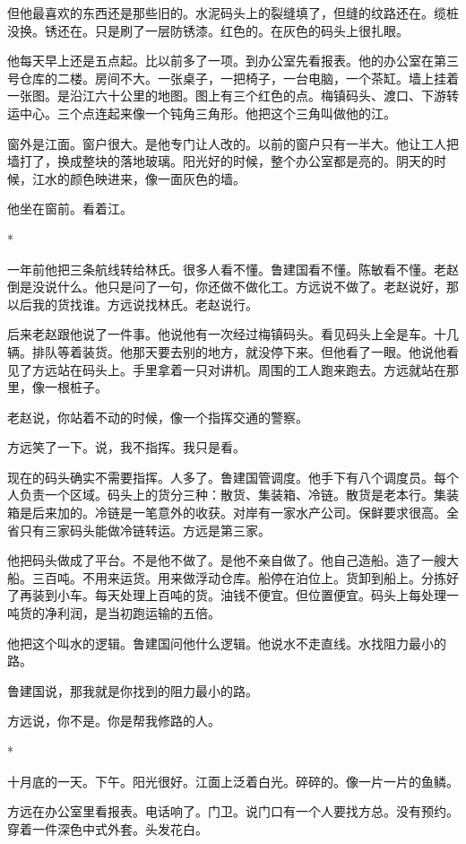 \documentclass[UTF8,a5paper,11pt,openany]{ctexbook}
\newcommand{\scene}{\vspace{1em}\begin{center}*\quad*\quad*\end{center}\vspace{0.5em}}
\begin{document}
但他最喜欢的东西还是那些旧的。水泥码头上的裂缝填了，但缝的纹路还在。缆桩没换。锈还在。只是刷了一层防锈漆。红色的。在灰色的码头上很扎眼。

他每天早上还是五点起。比以前多了一项。到办公室先看报表。他的办公室在第三号仓库的二楼。房间不大。一张桌子，一把椅子，一台电脑，一个茶缸。墙上挂着一张图。是沿江六十公里的地图。图上有三个红色的点。梅镇码头、渡口、下游转运中心。三个点连起来像一个钝角三角形。他把这个三角叫做他的江。

窗外是江面。窗户很大。是他专门让人改的。以前的窗户只有一半大。他让工人把墙打了，换成整块的落地玻璃。阳光好的时候，整个办公室都是亮的。阴天的时候，江水的颜色映进来，像一面灰色的墙。

他坐在窗前。看着江。


\scene

一年前他把三条航线转给林氏。很多人看不懂。鲁建国看不懂。陈敏看不懂。老赵倒是没说什么。他只是问了一句，你还做不做化工。方远说不做了。老赵说好，那以后我的货找谁。方远说找林氏。老赵说行。

后来老赵跟他说了一件事。他说他有一次经过梅镇码头。看见码头上全是车。十几辆。排队等着装货。他那天要去别的地方，就没停下来。但他看了一眼。他说他看见了方远站在码头上。手里拿着一只对讲机。周围的工人跑来跑去。方远就站在那里，像一根桩子。

老赵说，你站着不动的时候，像一个指挥交通的警察。

方远笑了一下。说，我不指挥。我只是看。

现在的码头确实不需要指挥。人多了。鲁建国管调度。他手下有八个调度员。每个人负责一个区域。码头上的货分三种：散货、集装箱、冷链。散货是老本行。集装箱是后来加的。冷链是一笔意外的收获。对岸有一家水产公司。保鲜要求很高。全省只有三家码头能做冷链转运。方远是第三家。

他把码头做成了平台。不是他不做了。是他不亲自做了。他自己造船。造了一艘大船。三百吨。不用来运货。用来做浮动仓库。船停在泊位上。货卸到船上。分拣好了再装到小车。每天处理上百吨的货。油钱不便宜。但位置便宜。码头上每处理一吨货的净利润，是当初跑运输的五倍。

他把这个叫水的逻辑。鲁建国问他什么逻辑。他说水不走直线。水找阻力最小的路。

鲁建国说，那我就是你找到的阻力最小的路。

方远说，你不是。你是帮我修路的人。


\scene

十月底的一天。下午。阳光很好。江面上泛着白光。碎碎的。像一片一片的鱼鳞。

方远在办公室里看报表。电话响了。门卫。说门口有一个人要找方总。没有预约。穿着一件深色中式外套。头发花白。
\end{document}
